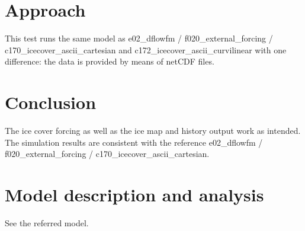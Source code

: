 \section*{Approach}
This test runs the same model as e02\_dflowfm / f020\_external\_forcing / c170\_icecover\_ascii\_cartesian and c172\_icecover\_ascii\_curvilinear with one difference: the data is provided by means of netCDF files.

\section*{Conclusion} 
The ice cover forcing as well as the ice map and history output work as intended.
The simulation results are consistent with the reference e02\_dflowfm / f020\_external\_forcing / c170\_icecover\_ascii\_cartesian.

\section*{Model description and analysis}

See the referred model.

\printrefsegment
